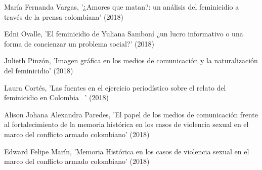 \documentclass[11pt,a4paper,]{awesome-cv}
\begin{document}
\begin{cventries}
{\begin{cvitems}
\item María Fernanda Vargas, '¿Amores que matan?: un análisis del feminicidio a través de la prensa colombiana' (2018)
\item Edni Ovalle, 'El feminicidio de Yuliana Samboní ¿un lucro informativo o una forma de concienzar un problema social?' (2018)
\item Julieth Pinzón, 'Imagen gráfica en los medios de comunicación y la naturalización del feminicidio' (2018)
\item Laura Cortés, 'Las fuentes en el ejercicio periodístico sobre el relato del feminicidio en Colombia  ' (2018)
\item Alison Johana Alexandra Paredes, 'El papel de los medios de comunicación frente al fortalecimiento de la memoria histórica en los casos de violencia sexual en el marco del conflicto armado colombiano' (2018)
\item Edward Felipe Marín, 'Memoria Histórica en los casos de violencia sexual en el marco del conflicto armado colombiano' (2018)
\end{cvitems}}
\end{cventries}
\end{document}
